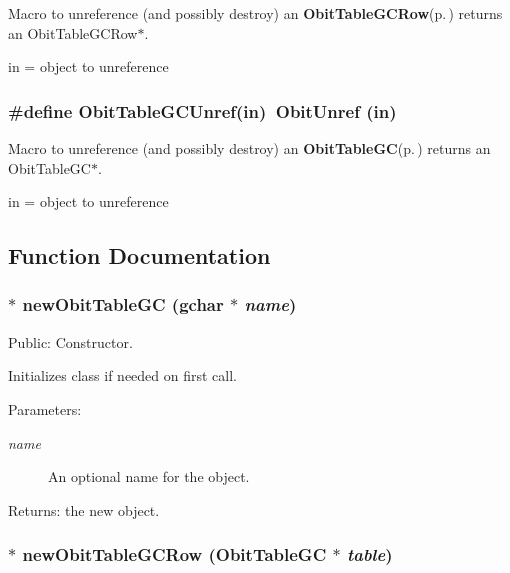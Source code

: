 Macro to unreference (and possibly destroy) an {\bf Obit\-Table\-GCRow}{\rm (p.\,\pageref{structObitTableGCRow})} returns an Obit\-Table\-GCRow$\ast$. 

in = object to unreference 
\subsubsection{\setlength{\rightskip}{0pt plus 5cm}\#define Obit\-Table\-GCUnref(in)\ Obit\-Unref (in)}\label{ObitTableGC_8h_a1}


Macro to unreference (and possibly destroy) an {\bf Obit\-Table\-GC}{\rm (p.\,\pageref{structObitTableGC})} returns an Obit\-Table\-GC$\ast$. 

in = object to unreference 

\subsection{Function Documentation}
\subsubsection{$\ast$ new\-Obit\-Table\-GC (gchar $\ast$ {\em name})}\label{ObitTableGC_8h_a11}


Public: Constructor. 

Initializes class if needed on first call. \begin{Desc}
\item[Parameters:]
\begin{description}
\item[{\em name}]An optional name for the object. \end{description}
\end{Desc}
\begin{Desc}
\item[Returns:]the new object. \end{Desc}
\subsubsection{$\ast$ new\-Obit\-Table\-GCRow ({\bf Obit\-Table\-GC} $\ast$ {\em table})}\label{ObitTableGC_8h_a8}


